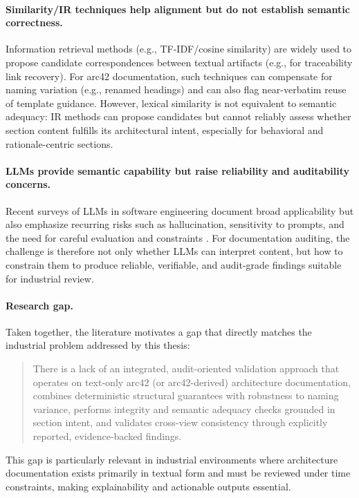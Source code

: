 \paragraph{Similarity/IR techniques help alignment but do not establish semantic correctness.}
Information retrieval methods (e.g., TF-IDF/cosine similarity) are widely used to propose candidate correspondences between textual artifacts (e.g., for traceability link recovery). For arc42 documentation, such techniques can compensate for naming variation (e.g., renamed headings) and can also flag near-verbatim reuse of template guidance. However, lexical similarity is not equivalent to semantic adequacy: IR methods can propose candidates but cannot reliably assess whether section content fulfills its architectural intent, especially for behavioral and rationale-centric sections.

\paragraph{LLMs provide semantic capability but raise reliability and auditability concerns.}
Recent surveys of LLMs in software engineering document broad applicability but also emphasize recurring risks such as hallucination, sensitivity to prompts, and the need for careful evaluation and constraints \cite{llm4se_slr}. For documentation auditing, the challenge is therefore not only whether LLMs can interpret content, but how to constrain them to produce reliable, verifiable, and audit-grade findings suitable for industrial review.

\paragraph{Research gap.}
Taken together, the literature motivates a gap that directly matches the industrial problem addressed by this thesis:

\begin{quote}
There is a lack of an integrated, audit-oriented validation approach that operates on text-only arc42 (or arc42-derived) architecture documentation, combines deterministic structural guarantees with robustness to naming variance, performs integrity and semantic adequacy checks grounded in section intent, and validates cross-view consistency through explicitly reported, evidence-backed findings.
\end{quote}

This gap is particularly relevant in industrial environments where architecture documentation exists primarily in textual form and must be reviewed under time constraints, making explainability and actionable outputs essential.

